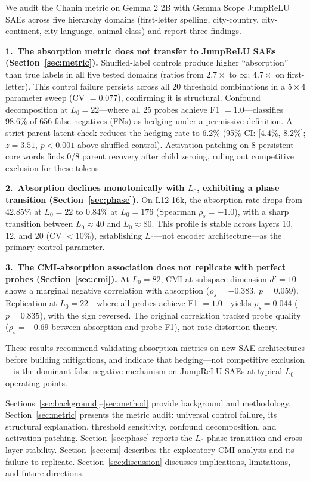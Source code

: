 \documentclass{article}
\begin{document}
We audit the Chanin metric on Gemma 2 2B with Gemma Scope JumpReLU SAEs across five hierarchy domains (first-letter spelling, city-country, city-continent, city-language, animal-class) and report three findings.

\textbf{1.\ The absorption metric does not transfer to JumpReLU SAEs (Section~\ref{sec:metric}).} Shuffled-label controls produce higher ``absorption'' than true labels in all five tested domains (ratios from $2.7\times$ to $\infty$; $4.7\times$ on first-letter). This control failure persists across all 20 threshold combinations in a $5 \times 4$ parameter sweep (CV $= 0.077$), confirming it is structural. Confound decomposition at $L_0 = 22$---where all 25 probes achieve F1 $= 1.0$---classifies 98.6\% of 656 false negatives (FNs) as hedging under a permissive definition. A strict parent-latent check reduces the hedging rate to 6.2\% (95\% CI: [4.4\%, 8.2\%]; $z = 3.51$, $p < 0.001$ above shuffled control). Activation patching on 8 persistent core words finds 0/8 parent recovery after child zeroing, ruling out competitive exclusion for these tokens.

\textbf{2.\ Absorption declines monotonically with $L_0$, exhibiting a phase transition (Section~\ref{sec:phase}).} On L12-16k, the absorption rate drops from 42.85\% at $L_0 = 22$ to 0.84\% at $L_0 = 176$ (Spearman $\rho_s = -1.0$), with a sharp transition between $L_0 \approx 40$ and $L_0 \approx 80$. This profile is stable across layers 10, 12, and 20 (CV $< 10\%$), establishing $L_0$---not encoder architecture---as the primary control parameter.

\textbf{3.\ The CMI-absorption association does not replicate with perfect probes (Section~\ref{sec:cmi}).} At $L_0 = 82$, CMI at subspace dimension $d' = 10$ shows a marginal negative correlation with absorption ($\rho_s = -0.383$, $p = 0.059$). Replication at $L_0 = 22$---where all probes achieve F1 $= 1.0$---yields $\rho_s = 0.044$ ($p = 0.835$), with the sign reversed. The original correlation tracked probe quality ($\rho_s = -0.69$ between absorption and probe F1), not rate-distortion theory.

These results recommend validating absorption metrics on new SAE architectures before building mitigations, and indicate that hedging---not competitive exclusion---is the dominant false-negative mechanism on JumpReLU SAEs at typical $L_0$ operating points.

Sections~\ref{sec:background}--\ref{sec:method} provide background and methodology. Section~\ref{sec:metric} presents the metric audit: universal control failure, its structural explanation, threshold sensitivity, confound decomposition, and activation patching. Section~\ref{sec:phase} reports the $L_0$ phase transition and cross-layer stability. Section~\ref{sec:cmi} describes the exploratory CMI analysis and its failure to replicate. Section~\ref{sec:discussion} discusses implications, limitations, and future directions.
\end{document}
